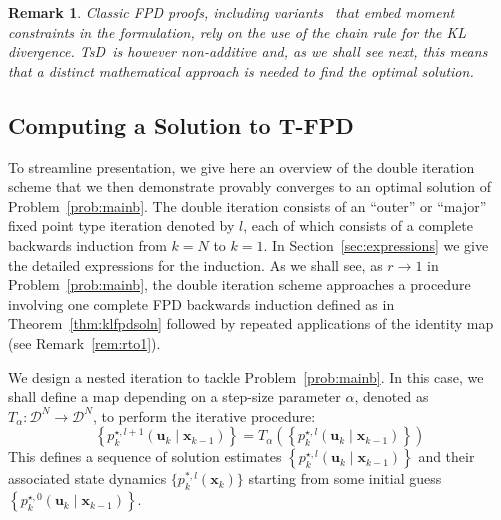 \documentclass[a4paper,fleqn]{cas-sc}
\newcommand{\bv}[1]{\mathbf{#1}}
\newcommand{\optimalpolicy}[2]{p^{\star}_{{#1}} \left(\bv{u}_{{#1}}\mid \bv{x}_{{#2}} \right)}
\newcommand{\optimalpolicygen}[3]{p^{\star,{#3}}_{{#1}} \left(\bv{u}_{{#1}}\mid \bv{x}_{{#2}} \right)}
\newcommand{\refpolicy}[2]{q_{{#1}}\left(\bv{u}_{{#1}}\mid \bv{x}_{{#2}} \right)}
\newcommand{\TsD}{TsD}
\newtheorem{remark}[theorem]{Remark}
\begin{document}
\begin{remark}
Classic FPD proofs, including variants~\cite{gagliardi2022probabilistic} that embed moment constraints in the  formulation, rely on the use of the chain rule for the KL divergence. \TsD~is however non-additive and, as we shall see next, this means that a distinct mathematical approach is needed to find the optimal solution. 
\end{remark}




\subsection{Computing a Solution to T-FPD}

To streamline presentation, we give here an overview of the double iteration scheme that we then demonstrate provably converges to an optimal solution of Problem~\ref{prob:mainb}. The double iteration consists of an ``outer'' or ``major'' fixed point type iteration denoted by $l$, each of which consists of a complete backwards induction from $k=N$ to $k=1$. In Section~\ref{sec:expressions} we give the detailed expressions for the induction. As we shall see, as $r\to 1$ in Problem~\ref{prob:mainb}, the double iteration scheme approaches a procedure involving one complete FPD backwards induction defined as in Theorem~\ref{thm:klfpdsoln} followed by repeated applications of the identity map (see Remark~\ref{rem:rto1}).



We design a nested iteration to tackle Problem~\ref{prob:mainb}. In this case, we shall define a map depending on a step-size parameter $\alpha$, denoted as $T_{\alpha}:\mathcal{D}^N\to \mathcal{D}^N$, to perform the iterative procedure:
\begin{equation}\label{eq:tsdmapiter}
\left\{\optimalpolicygen{k}{k-1}{l+1}\right\}=T_{\alpha}\left(\left\{\optimalpolicygen{k}{k-1}{l}\right\}\right)
\end{equation}
This defines a sequence of solution estimates $\left\{\optimalpolicygen{k}{k-1}{l}\right\}$ and their associated state dynamics $\{p^{*,l}_k(\bv{x}_k)\}$ starting from some initial guess $\left\{\optimalpolicygen{k}{k-1}{0}\right\}$.
\end{document}
